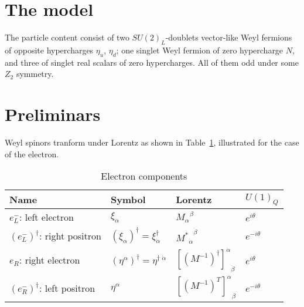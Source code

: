 \section{The model}
 The particle content consist of two $SU(2)_L$-doublets vector-like
 Weyl fermions of opposite hypercharges $\eta_u$, $\eta_d$; one singlet
 Weyl fermion of zero hypercharge $N$, and three of singlet real
 scalars of zero hypercharges. All of them odd under some $Z_2$
 symmetry.

\section{Preliminars}

Weyl spinors tranform under Lorentz as shown in Table~\ref{tab:electron}, illustrated for the case of the electron.

\begin{table}
  \centering
  \begin{tabular}{llll}
    Name & Symbol & Lorentz & $U(1)_Q$\\\hline
   $e_L^-$: left electron & $\xi_{\alpha}$ & ${M_{\alpha}}^{\beta}$ & $e^{i\theta}$\\
   $\left( e_L^- \right)^{\dagger}$: right positron    & $\left( \xi_{\alpha} \right)^{\dagger}=\xi^{\dagger}_{\dot{\alpha}}$ & ${{M^{*}}_{\dot{\alpha}}}^{\dot{\beta}}$ & $e^{-i\theta}$\\
   $e_R$: right electron   & $\left( \eta^{\alpha} \right)^{\dagger}=\eta^{\dagger\;\dot{\alpha}}$ & ${\left[ \left( M^{-1} \right)^\dagger \right]^{\dot{\alpha}}}_{\dot{\beta}}$& $e^{i\theta}$\\
   $\left( e_R^{-} \right)^{\dagger}$: left positron &$\eta^{\alpha}$& ${\left[ \left( M^{-1} \right)^T \right]^{\alpha}}_{\beta}$ & $e^{-i\theta}$\\\hline
  \end{tabular}
  \caption{Electron components}
  \label{tab:electron}
\end{table}



